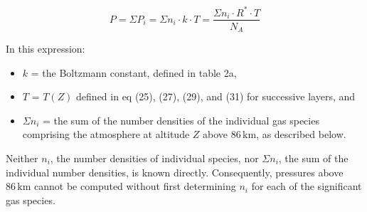 \documentclass{article}
\begin{document}
\[
P = \Sigma P_i = \Sigma n_i \cdot k \cdot T = \frac{\Sigma n_i \cdot R^* \cdot T}{N_A} \tag{33c}
\]

In this expression:

\begin{itemize}
    \item $k$ = the Boltzmann constant, defined in table 2a,
    \item $T$ = $T(Z)$ defined in eq (25), (27), (29), and (31) for successive layers, and
    \item $\Sigma n_i$ = the sum of the number densities of the individual gas species comprising the atmosphere at altitude $Z$ above $86 \, \text{km}$, as described below.
\end{itemize}

Neither $n_i$, the number densities of individual species, nor $\Sigma n_i$, the sum of the individual number densities, is known directly. Consequently, pressures above $86 \, \text{km}$ cannot be computed without first determining $n_i$ for each of the significant gas species.
\end{document}
